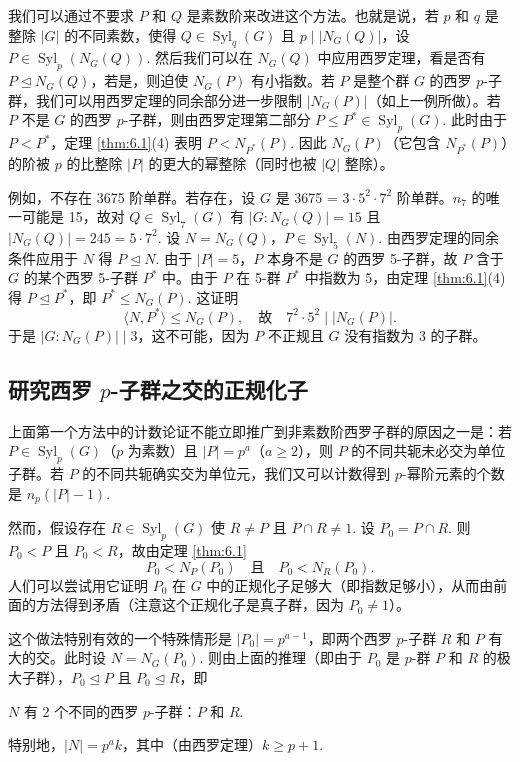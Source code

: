 我们可以通过不要求 \(P\) 和 \(Q\) 是素数阶来改进这个方法。也就是说，若 \(p\) 和 \(q\) 是整除 \(|G|\) 的不同素数，使得 \(Q \in \operatorname{Syl}_q(G)\) 且 \(p \mid |N_G(Q)|\)，设 \(P \in \operatorname{Syl}_p(N_G(Q))\). 然后我们可以在 \(N_G(Q)\) 中应用西罗定理，看是否有 \(P \trianglelefteq N_G(Q)\)，若是，则迫使 \(N_G(P)\) 有小指数。若 \(P\) 是整个群 \(G\) 的西罗 \(p\)-子群，我们可以用西罗定理的同余部分进一步限制 \(|N_G(P)|\)（如上一例所做）。若 \(P\) 不是 \(G\) 的西罗 \(p\)-子群，则由西罗定理第二部分 \(P \leq P^* \in \operatorname{Syl}_p(G)\). 此时由于 \(P < P^*\)，定理 \ref{thm:6.1}(4) 表明 \(P < N_{P^*}(P)\). 因此 \(N_G(P)\)（它包含 \(N_{P^*}(P)\)）的阶被 \(p\) 的比整除 \(|P|\) 的更大的幂整除（同时也被 \(|Q|\) 整除）。

例如，不存在 3675 阶单群。若存在，设 \(G\) 是 3675 = \(3 \cdot 5^2 \cdot 7^2\) 阶单群。\(n_7\) 的唯一可能是 15，故对 \(Q \in \operatorname{Syl}_7(G)\) 有 \(|G : N_G(Q)| = 15\) 且 \(|N_G(Q)| = 245 = 5 \cdot 7^2\). 设 \(N = N_G(Q)\)，\(P \in \operatorname{Syl}_5(N)\). 由西罗定理的同余条件应用于 \(N\) 得 \(P \trianglelefteq N\). 由于 \(|P| = 5\)，\(P\) 本身不是 \(G\) 的西罗 5-子群，故 \(P\) 含于 \(G\) 的某个西罗 5-子群 \(P^*\) 中。由于 \(P\) 在 5-群 \(P^*\) 中指数为 5，由定理 \ref{thm:6.1}(4) 得 \(P \trianglelefteq P^*\)，即 \(P^* \leq N_G(P)\). 这证明
\[
\langle N, P^* \rangle \leq N_G(P), \quad \text{故} \quad 7^2 \cdot 5^2 \mid |N_G(P)|.
\]
于是 \(|G : N_G(P)| \mid 3\)，这不可能，因为 \(P\) 不正规且 \(G\) 没有指数为 3 的子群。

\subsection*{研究西罗 \(p\)-子群之交的正规化子}

上面第一个方法中的计数论证不能立即推广到非素数阶西罗子群的原因之一是：若 \(P \in \operatorname{Syl}_p(G)\)（\(p\) 为素数）且 \(|P| = p^a\)（\(a \geq 2\)），则 \(P\) 的不同共轭未必交为单位子群。若 \(P\) 的不同共轭确实交为单位元，我们又可以计数得到 \(p\)-幂阶元素的个数是 \(n_p(|P| - 1)\).

然而，假设存在 \(R \in \operatorname{Syl}_p(G)\) 使 \(R \neq P\) 且 \(P \cap R \neq 1\). 设 \(P_0 = P \cap R\). 则 \(P_0 < P\) 且 \(P_0 < R\)，故由定理 \ref{thm:6.1}
\[
P_0 < N_P(P_0) \quad \text{且} \quad P_0 < N_R(P_0).
\]
人们可以尝试用它证明 \(P_0\) 在 \(G\) 中的正规化子足够大（即指数足够小），从而由前面的方法得到矛盾（注意这个正规化子是真子群，因为 \(P_0 \neq 1\)）。

这个做法特别有效的一个特殊情形是 \(|P_0| = p^{a-1}\)，即两个西罗 \(p\)-子群 \(R\) 和 \(P\) 有大的交。此时设 \(N = N_G(P_0)\). 则由上面的推理（即由于 \(P_0\) 是 \(p\)-群 \(P\) 和 \(R\) 的极大子群），\(P_0 \trianglelefteq P\) 且 \(P_0 \trianglelefteq R\)，即
\begin{center}
\(N\) 有 2 个不同的西罗 \(p\)-子群：\(P\) 和 \(R\).
\end{center}
特别地，\(|N| = p^a k\)，其中（由西罗定理）\(k \geq p+1\).

